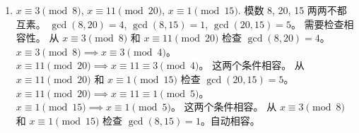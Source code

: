 \begin{enumerate}
\begin{solution}
\begin{enumerate}
            \item $x \equiv 3 \pmod 8$, $x \equiv 11 \pmod{20}$, $x \equiv 1 \pmod{15}$.
            模数 8, 20, 15 两两不都互素。
            $\gcd(8, 20)=4$, $\gcd(8, 15)=1$, $\gcd(20, 15)=5$。
            需要检查相容性。
            从 $x \equiv 3 \pmod 8$ 和 $x \equiv 11 \pmod{20}$ 检查 $\gcd(8, 20)=4$。
            $x \equiv 3 \pmod 8 \implies x \equiv 3 \pmod 4$。
            $x \equiv 11 \pmod{20} \implies x \equiv 11 \equiv 3 \pmod 4$。
            这两个条件相容。
            从 $x \equiv 11 \pmod{20}$ 和 $x \equiv 1 \pmod{15}$ 检查 $\gcd(20, 15)=5$。
            $x \equiv 11 \pmod{20} \implies x \equiv 11 \equiv 1 \pmod 5$。
            $x \equiv 1 \pmod{15} \implies x \equiv 1 \pmod 5$。
            这两个条件相容。
            从 $x \equiv 3 \pmod 8$ 和 $x \equiv 1 \pmod{15}$ 检查 $\gcd(8, 15)=1$。自动相容。
            

\end{enumerate}
\end{solution}
\end{enumerate}
